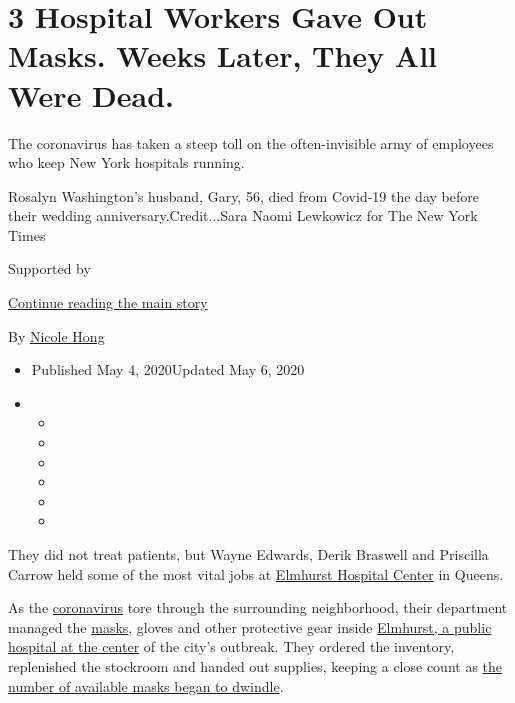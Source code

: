 \hypertarget{3-hospital-workers-gave-out-masks-weeks-later-they-all-were-dead}{%
\section{3 Hospital Workers Gave Out Masks. Weeks Later, They All Were
Dead.}\label{3-hospital-workers-gave-out-masks-weeks-later-they-all-were-dead}}

The coronavirus has taken a steep toll on the often-invisible army of
employees who keep New York hospitals running.

Rosalyn Washington's husband, Gary, 56, died from Covid-19 the day
before their wedding anniversary.Credit...Sara Naomi Lewkowicz for The
New York Times

Supported by

\protect\hyperlink{after-sponsor}{Continue reading the main story}

By \href{https://www.nytimes3xbfgragh.onion/by/nicole-hong}{Nicole Hong}

\begin{itemize}
\item
  Published May 4, 2020Updated May 6, 2020
\item
  \begin{itemize}
  \item
  \item
  \item
  \item
  \item
  \item
  \end{itemize}
\end{itemize}

They did not treat patients, but Wayne Edwards, Derik Braswell and
Priscilla Carrow held some of the most vital jobs at
\href{https://www.nytimes3xbfgragh.onion/2020/05/20/nyregion/hospitals-coronavirus-cases-decline.html}{Elmhurst
Hospital Center} in Queens.

As the
\href{https://www.nytimes3xbfgragh.onion/2020/05/06/us/politics/coronavirus-masks-tests-ppe.html}{coronavirus}
tore through the surrounding neighborhood, their department managed the
\href{https://www.nytimes3xbfgragh.onion/2020/05/06/us/politics/coronavirus-masks-tests-ppe.html}{masks},
gloves and other protective gear inside
\href{https://www.nytimes3xbfgragh.onion/2020/03/25/nyregion/nyc-coronavirus-hospitals.html}{Elmhurst,
a public hospital at the center} of the city's outbreak. They ordered
the inventory, replenished the stockroom and handed out supplies,
keeping a close count as
\href{https://www.nytimes3xbfgragh.onion/2020/03/19/health/coronavirus-masks-shortage.html}{the
number of available masks began to dwindle}.

